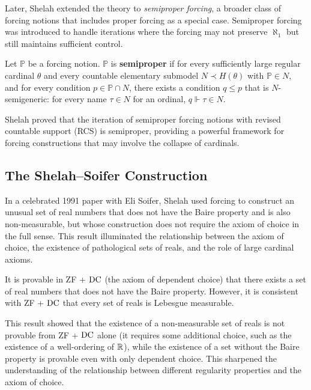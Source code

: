 Later, Shelah extended the theory to \emph{semiproper forcing}, a broader class of forcing notions that includes proper forcing as a special case. Semiproper forcing was introduced to handle iterations where the forcing may not preserve \(\aleph_1\) but still maintains sufficient control.

\begin{definition}
Let \(\mathbb{P}\) be a forcing notion. \(\mathbb{P}\) is \textbf{semiproper} if for every sufficiently large regular cardinal \(\theta\) and every countable elementary submodel \(N \prec H(\theta)\) with \(\mathbb{P} \in N\), and for every condition \(p \in \mathbb{P} \cap N\), there exists a condition \(q \leq p\) that is \(N\)-semigeneric: for every name \(\tau \in N\) for an ordinal, \(q \Vdash \tau \in N\).
\end{definition}

Shelah proved that the iteration of semiproper forcing notions with revised countable support (RCS) is semiproper, providing a powerful framework for forcing constructions that may involve the collapse of cardinals.

\subsection{The Shelah--Soifer Construction}

In a celebrated 1991 paper with Eli Soifer, Shelah used forcing to construct an unusual set of real numbers that does not have the Baire property and is also non-measurable, but whose construction does not require the axiom of choice in the full sense. This result illuminated the relationship between the axiom of choice, the existence of pathological sets of reals, and the role of large cardinal axioms.

\begin{theorem}
It is provable in ZF + \(\operatorname{DC}\) (the axiom of dependent choice) that there exists a set of real numbers that does not have the Baire property. However, it is consistent with ZF + \(\operatorname{DC}\) that every set of reals is Lebesgue measurable.
\end{theorem}

This result showed that the existence of a non-measurable set of reals is not provable from ZF + \(\operatorname{DC}\) alone (it requires some additional choice, such as the existence of a well-ordering of \(\mathbb{R}\)), while the existence of a set without the Baire property is provable even with only dependent choice. This sharpened the understanding of the relationship between different regularity properties and the axiom of choice.

